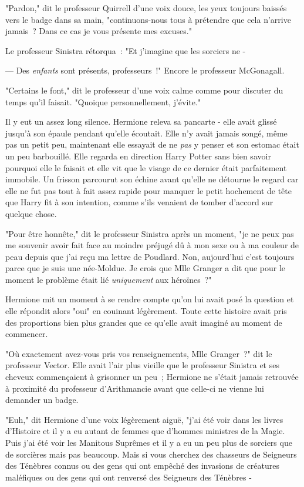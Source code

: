 "Pardon," dit le professeur Quirrell d'une voix douce, les yeux toujours baissés vers le badge dans sa main, "continuons-nous tous à prétendre que cela n'arrive jamais~? Dans ce cas je vous présente mes excuses."

Le professeur Sinistra rétorqua~: "Et j'imagine que les sorciers ne -

--- Des \emph{enfants} sont présents, professeurs~!" Encore le professeur McGonagall.

"Certains le font," dit le professeur d'une voix calme comme pour discuter du temps qu'il faisait. "Quoique personnellement, j'évite."

Il y eut un assez long silence. Hermione releva sa pancarte - elle avait glissé jusqu'à son épaule pendant qu'elle écoutait. Elle n'y avait jamais songé, même pas un petit peu, maintenant elle essayait de ne \emph{pas} y penser et son estomac était un peu barbouillé. Elle regarda en direction Harry Potter sans bien savoir pourquoi elle le faisait et elle vit que le visage de ce dernier était parfaitement immobile. Un frisson parcourut son échine avant qu'elle ne détourne le regard car elle ne fut pas tout à fait assez rapide pour manquer le petit hochement de tête que Harry fit à son intention, comme s'ils venaient de tomber d'accord sur quelque chose.

"Pour être honnête," dit le professeur Sinistra après un moment, "je ne peux pas me souvenir avoir fait face au moindre préjugé dû à mon sexe ou à ma couleur de peau depuis que j'ai reçu ma lettre de Poudlard. Non, aujourd'hui c'est toujours parce que je suis une née-Moldue. Je crois que Mlle Granger a dit que pour le moment le problème était lié \emph{uniquement} aux héroïnes~?"

Hermione mit un moment à se rendre compte qu'on lui avait posé la question et elle répondit alors "oui" en couinant légèrement. Toute cette histoire avait pris des proportions bien plus grandes que ce qu'elle avait imaginé au moment de commencer.

"Où exactement avez-vous pris vos renseignements, Mlle Granger~?" dit le professeur Vector. Elle avait l'air plus vieille que le professeur Sinistra et ses cheveux commençaient à grisonner un peu~; Hermione ne s'était jamais retrouvée à proximité du professeur d'Arithmancie avant que celle-ci ne vienne lui demander un badge.

"Euh," dit Hermione d'une voix légèrement aiguë, "j'ai été voir dans les livres d'Histoire et il y a eu autant de femmes que d'hommes ministres de la Magie. Puis j'ai été voir les Manitous Suprêmes et il y a eu un peu plus de sorciers que de sorcières mais pas beaucoup. Mais si vous cherchez des chasseurs de Seigneurs des Ténèbres connus ou des gens qui ont empêché des invasions de créatures maléfiques ou des gens qui ont renversé des Seigneurs des Ténèbres -

